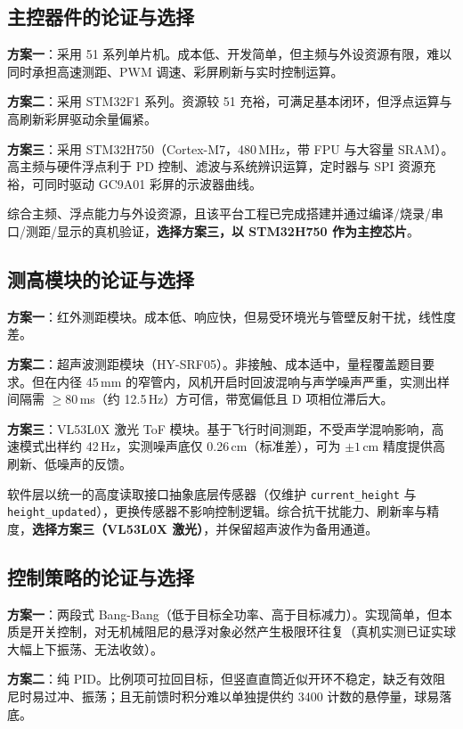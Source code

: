 \documentclass[12pt,a4paper]{ctexart}
\begin{document}
\subsection{主控器件的论证与选择}

\textbf{方案一}：采用 51 系列单片机。成本低、开发简单，但主频与外设资源有限，难以同时承担高速测距、PWM 调速、彩屏刷新与实时控制运算。

\textbf{方案二}：采用 STM32F1 系列。资源较 51 充裕，可满足基本闭环，但浮点运算与高刷新彩屏驱动余量偏紧。

\textbf{方案三}：采用 STM32H750（Cortex-M7，480\,MHz，带 FPU 与大容量 SRAM）。高主频与硬件浮点利于 PD 控制、滤波与系统辨识运算，定时器与 SPI 资源充裕，可同时驱动 GC9A01 彩屏的示波器曲线。

综合主频、浮点能力与外设资源，且该平台工程已完成搭建并通过编译/烧录/串口/测距/显示的真机验证，\textbf{选择方案三，以 STM32H750 作为主控芯片}。

\subsection{测高模块的论证与选择}

\textbf{方案一}：红外测距模块。成本低、响应快，但易受环境光与管壁反射干扰，线性度差。

\textbf{方案二}：超声波测距模块（HY-SRF05）。非接触、成本适中，量程覆盖题目要求。但在内径 45\,mm 的窄管内，风机开启时回波混响与声学噪声严重，实测出样间隔需 $\ge80$\,ms（约 12.5\,Hz）方可信，带宽偏低且 D 项相位滞后大。

\textbf{方案三}：VL53L0X 激光 ToF 模块。基于飞行时间测距，不受声学混响影响，高速模式出样约 42\,Hz，实测噪声底仅 0.26\,cm（标准差），可为 $\pm1$\,cm 精度提供高刷新、低噪声的反馈。

软件层以统一的高度读取接口抽象底层传感器（仅维护 \texttt{current\_height} 与 \texttt{height\_updated}），更换传感器不影响控制逻辑。综合抗干扰能力、刷新率与精度，\textbf{选择方案三（VL53L0X 激光）}，并保留超声波作为备用通道。

\subsection{控制策略的论证与选择}

\textbf{方案一}：两段式 Bang-Bang（低于目标全功率、高于目标减力）。实现简单，但本质是开关控制，对无机械阻尼的悬浮对象必然产生极限环往复（真机实测已证实球大幅上下振荡、无法收敛）。

\textbf{方案二}：纯 PID。比例项可拉回目标，但竖直直筒近似开环不稳定，缺乏有效阻尼时易过冲、振荡；且无前馈时积分难以单独提供约 3400 计数的悬停量，球易落底。
\end{document}
